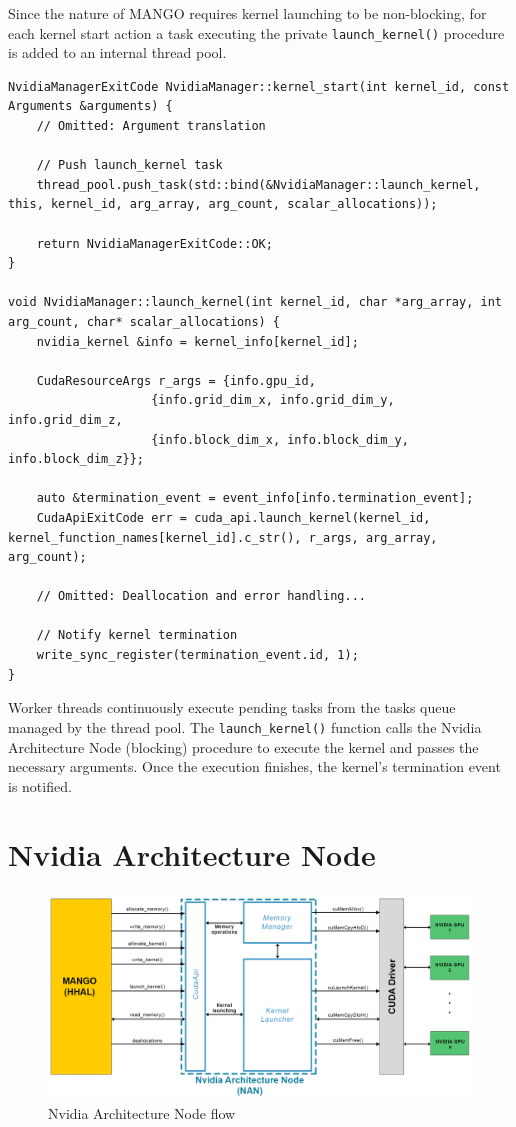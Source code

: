 Since the nature of MANGO requires kernel launching to be non-blocking, for each kernel start action a task executing the private \texttt{launch\_kernel()} procedure is added to an internal thread pool.

\begin{lstlisting}[style=CStyle, caption=HHAL Nvidia Manager - Kernel launch]
NvidiaManagerExitCode NvidiaManager::kernel_start(int kernel_id, const Arguments &arguments) {
    // Omitted: Argument translation

    // Push launch_kernel task
    thread_pool.push_task(std::bind(&NvidiaManager::launch_kernel, this, kernel_id, arg_array, arg_count, scalar_allocations));

    return NvidiaManagerExitCode::OK;
}

void NvidiaManager::launch_kernel(int kernel_id, char *arg_array, int arg_count, char* scalar_allocations) {
    nvidia_kernel &info = kernel_info[kernel_id];

    CudaResourceArgs r_args = {info.gpu_id, 
                    {info.grid_dim_x, info.grid_dim_y, info.grid_dim_z, 
                    {info.block_dim_x, info.block_dim_y, info.block_dim_z}};

    auto &termination_event = event_info[info.termination_event];
    CudaApiExitCode err = cuda_api.launch_kernel(kernel_id, kernel_function_names[kernel_id].c_str(), r_args, arg_array, arg_count);

    // Omitted: Deallocation and error handling...

    // Notify kernel termination
    write_sync_register(termination_event.id, 1); 
}
\end{lstlisting}

Worker threads continuously execute pending tasks from the tasks queue managed by the thread pool. 
The \texttt{launch\_kernel()} function calls the Nvidia Architecture Node (blocking) procedure to execute the kernel and passes the necessary arguments.
Once the execution finishes, the kernel's termination event is notified.

\section{Nvidia Architecture Node} \label{NvidiaArchitectureNode}

\begin{figure}[ht]
    \centering
    \includegraphics[width=\textwidth]{img/nan-diagram.png}
    \captionsetup{justification=centering}
    \caption{Nvidia Architecture Node flow}
    \label{fig:NANDiagram}
\end{figure}

